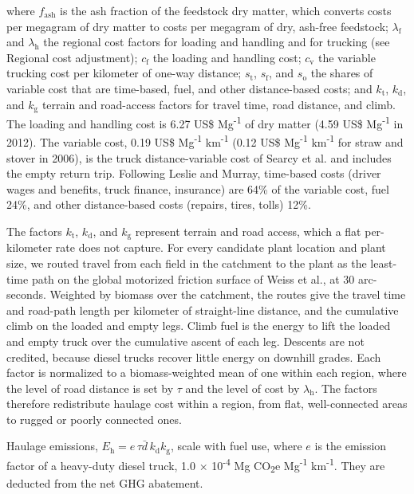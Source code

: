 \documentclass[
  letterpaper,
  twoside,
  twocolumn,
  9pt]{article}
\begin{document}
where \(f_{\mathrm{ash}}\) is the ash fraction of the feedstock dry
matter, which converts costs per megagram of dry matter to costs per
megagram of dry, ash-free feedstock; \(\lambda_{\mathrm{f}}\) and
\(\lambda_{\mathrm{h}}\) the regional cost factors for loading and
handling and for trucking (see Regional cost adjustment);
\(c_{\mathrm{f}}\) the loading and handling cost; \(c_{\mathrm{v}}\) the
variable trucking cost per kilometer of one-way distance;
\(s_{\mathrm{t}}\), \(s_{\mathrm{f}}\), and \(s_{\mathrm{o}}\) the
shares of variable cost that are time-based, fuel, and other
distance-based costs; and \(k_{\mathrm{t}}\), \(k_{\mathrm{d}}\), and
\(k_{\mathrm{g}}\) terrain and road-access factors for travel time, road
distance, and climb. The loading and handling cost is 6.27 US\$
Mg\textsuperscript{-1} of dry matter (4.59 US\$ Mg\textsuperscript{-1}
in 2012).\citep{beach2012} The variable cost, 0.19 US\$
Mg\textsuperscript{-1} km\textsuperscript{-1} (0.12 US\$
Mg\textsuperscript{-1} km\textsuperscript{-1} for straw and stover in
2006), is the truck distance-variable cost of Searcy et
al.\citep{searcy2007} and includes the empty return trip. Following
Leslie and Murray\citep{atri2024}, time-based costs (driver wages and
benefits, truck finance, insurance) are 64\% of the variable cost, fuel
24\%, and other distance-based costs (repairs, tires, tolls) 12\%.

The factors \(k_{\mathrm{t}}\), \(k_{\mathrm{d}}\), and
\(k_{\mathrm{g}}\) represent terrain and road access, which a flat
per-kilometer rate does not capture. For every candidate plant location
and plant size, we routed travel from each field in the catchment to the
plant as the least-time path on the global motorized friction surface of
Weiss et al.\citep{weiss2020}, at 30 arc-seconds. Weighted by biomass
over the catchment, the routes give the travel time and road-path length
per kilometer of straight-line distance, and the cumulative climb on the
loaded and empty legs. Climb fuel is the energy to lift the loaded and
empty truck over the cumulative ascent of each leg. Descents are not
credited, because diesel trucks recover little energy on downhill
grades. Each factor is normalized to a biomass-weighted mean of one
within each region, where the level of road distance is set by \(\tau\)
and the level of cost by \(\lambda_{\mathrm{h}}\). The factors therefore
redistribute haulage cost within a region, from flat, well-connected
areas to rugged or poorly connected ones.

Haulage emissions,
\(E_{\mathrm{h}} = e\, \tau \bar{d}\, k_{\mathrm{d}} k_{\mathrm{g}}\),
scale with fuel use, where \(e\) is the emission factor of a heavy-duty
diesel truck, 1.0 × 10\textsuperscript{-4} Mg CO\textsubscript{2}e
Mg\textsuperscript{-1} km\textsuperscript{-1}.\citep{glec2024} They are
deducted from the net GHG abatement.
\end{document}
